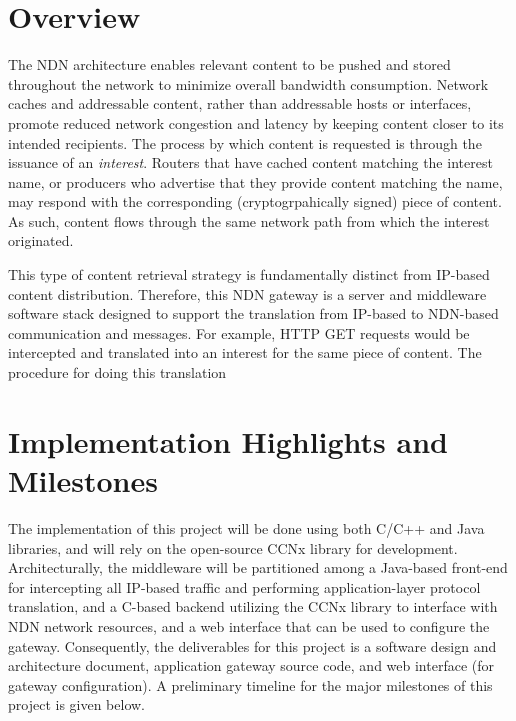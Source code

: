 \documentclass[10pt]{article}
\begin{document}
\section{Overview}
The NDN architecture enables relevant content to be pushed and stored throughout the network to minimize overall bandwidth consumption. Network caches and addressable content, rather than addressable hosts or interfaces, promote reduced network congestion and latency by keeping content closer to its intended recipients. The process by which content is requested is through the issuance of an \emph{interest}. Routers that have cached content matching the interest name, or producers who advertise that they provide content matching the name, may respond with the corresponding (cryptogrpahically signed) piece of content. As such, content flows through the same network path from which the interest originated. 

This type of content retrieval strategy is fundamentally distinct from IP-based content distribution. Therefore, this NDN gateway is a server and middleware software stack designed to support the translation from IP-based to NDN-based communication and messages. For example, HTTP GET requests would be intercepted and translated into an interest for the same piece of content. The procedure for doing this translation 


\section{Implementation Highlights and Milestones}
The implementation of this project will be done using both C/C++ and Java libraries, and will rely on the open-source CCNx \cite{ccnx} library for development. Architecturally, the middleware will be partitioned among a Java-based front-end for intercepting all IP-based traffic and performing application-layer protocol translation, and a C-based backend utilizing the CCNx library to interface with NDN network resources, and a web interface that can be used to configure the gateway. Consequently, the deliverables for this project is a software design and architecture document, application gateway source code, and web interface (for gateway configuration). A preliminary timeline for the major milestones of this project is given below.
\end{document}
